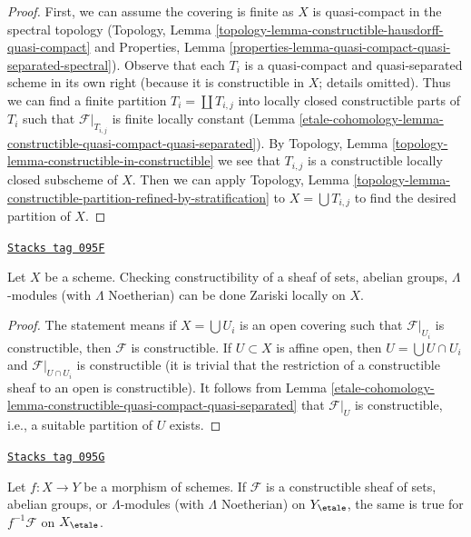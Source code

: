 \begin{proof}
First, we can assume the covering is finite as $X$ is quasi-compact
in the spectral topology
(Topology, Lemma \ref{topology-lemma-constructible-hausdorff-quasi-compact}
and
Properties, Lemma
\ref{properties-lemma-quasi-compact-quasi-separated-spectral}).
Observe that each $T_i$ is a quasi-compact and quasi-separated
scheme in its own right (because it is constructible in $X$; details omitted).
Thus we can find a finite partition $T_i = \coprod T_{i, j}$ into
locally closed constructible parts of $T_i$ such that
$\mathcal{F}|_{T_{i, j}}$ is finite locally constant
(Lemma \ref{etale-cohomology-lemma-constructible-quasi-compact-quasi-separated}).
By Topology, Lemma \ref{topology-lemma-constructible-in-constructible}
we see that $T_{i, j}$ is a constructible locally closed subscheme of $X$.
Then we can apply Topology, Lemma
\ref{topology-lemma-constructible-partition-refined-by-stratification}
to $X = \bigcup T_{i, j}$ to find the desired partition of $X$.
\end{proof}

\begin{lemma}
\label{etale-cohomology-lemma-constructible-local}
\href{https://stacks.math.columbia.edu/tag/095F}{\texttt{Stacks tag 095F}}

Let $X$ be a scheme. Checking constructibility of a sheaf
of sets, abelian groups, $\Lambda$-modules (with $\Lambda$ Noetherian)
can be done Zariski locally on $X$.
\end{lemma}

\begin{proof}
The statement means if $X = \bigcup U_i$ is an open covering
such that $\mathcal{F}|_{U_i}$ is constructible, then $\mathcal{F}$
is constructible. If $U \subset X$ is affine open, then
$U = \bigcup U \cap U_i$ and $\mathcal{F}|_{U \cap U_i}$ is constructible
(it is trivial that the restriction of a constructible sheaf to
an open is constructible). It follows from
Lemma \ref{etale-cohomology-lemma-constructible-quasi-compact-quasi-separated}
that $\mathcal{F}|_U$ is constructible, i.e., a suitable partition
of $U$ exists.
\end{proof}

\begin{lemma}
\label{etale-cohomology-lemma-pullback-constructible}
\href{https://stacks.math.columbia.edu/tag/095G}{\texttt{Stacks tag 095G}}

Let $f : X \to Y$ be a morphism of schemes. If $\mathcal{F}$ is a
constructible sheaf of sets, abelian groups, or $\Lambda$-modules
(with $\Lambda$ Noetherian) on $Y_\etale$, the same
is true for $f^{-1}\mathcal{F}$ on $X_\etale$.
\end{lemma}

